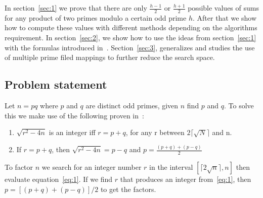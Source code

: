 \documentclass{article}
\begin{document}
	In section~\ref{sec:1} we prove that there are only $\frac{h-1}{2}$ or $\frac{h+1}{2}$ possible values of sums for any product of two primes modulo a certain odd prime $h$. After that we show how to compute these values with different methods depending on the algorithms requirement. In section~\ref{sec:2}, we show how to use the ideas from section~\ref{sec:1} with the formulas introduced in~\cite{Mohammed2017}. Section~\ref{sec:3}, generalizes and studies the use of multiple prime filed mappings to further reduce the search space. 

	\subsection{Problem statement}
	Let $n=pq$ where $p$ and $q$ are distinct odd primes, given $n$ find $p$ and $q$. To solve this we make use of the following proven in~\cite{Mohammed2017}:
	\begin{enumerate}
		\item $\sqrt{r^2 - 4n}$ is an integer iff $r=p+q$, for any r between $2 \lceil \sqrt{N} \rceil $ and n.

		\item If $r=p+q$, then $\sqrt{r^2 - 4n} = p-q$ and $ p =  \frac{(p+q)+(p-q)}{2}$
	\end{enumerate}

		To factor $n$ we search for an integer number $r$  in the interval $\left[ \lceil 2 \sqrt{n} \rceil , n \right]$ then evaluate equation~\ref{eq:1}. If we find $r$ that produces an integer from~\ref{eq:1}, then $p=[(p+q)+(p-q)]/2$ to get the factors.



\end{document}
